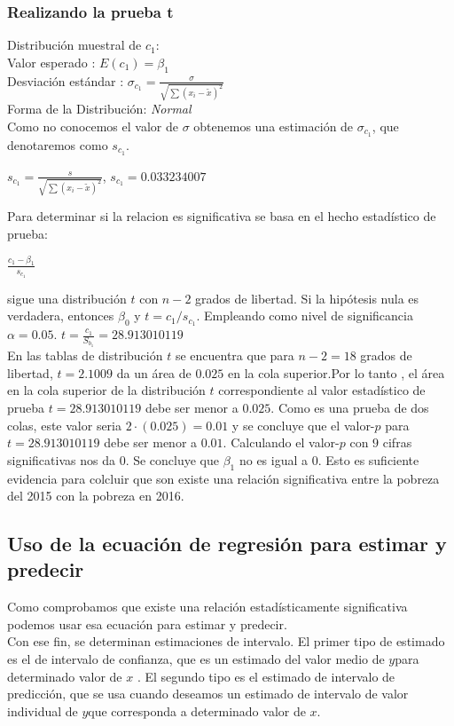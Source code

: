 \documentclass[twocolumn,twoside]{article}
\begin{document}
\subsubsection{Realizando la prueba t}

Distribuci\'on muestral de $c_1$:\\
Valor esperado : $E(c_1)=\beta_1$\\
Desviaci\'on est\'andar : $\sigma_{c_1}=\frac{\sigma}{\sqrt{\sum (x_i-\tilde{x})^2}}$\\
Forma de la Distribuci\'on: \textit{Normal}\\
Como no conocemos el valor de $\sigma$ obtenemos una estimaci\'on de $\sigma_{c_1}$, que denotaremos
como $s_{c_1}$.
\begin{center}
  $s_{c_1}=\frac{s}{\sqrt{\sum (x_i-\tilde{x})^2}}$, $s_{c_1}=0.033234007$
\end{center}

Para determinar si la relacion es significativa se basa en el hecho estad\'istico de prueba:
\begin{center}
  $\frac{c_1-\beta_1}{s_{c_1}}$
\end{center}

sigue una distribuci\'on $t$ con $n-2$ grados de libertad. Si la hip\'otesis nula es verdadera, entonces
$\beta_0$ y $t=c_1/s_{c_1}$. Empleando como nivel de significancia $\alpha=0.05$.
$t=\frac{c_1}{S_{b_1}}=28.913010119$\\
En las tablas de distribuci\'on $t$ se encuentra que para $n-2=18$ grados de libertad, $t=2.1009$
da un \'area de $0.025$ en la cola superior.Por lo tanto , el \'area en la cola superior de la
distribuci\'on $t$ correspondiente al valor estad\'istico de prueba $t=28.913010119$  debe ser menor
a $0.025$. Como es una prueba de dos colas, este valor seria $2\cdot (0.025)=0.01$ y se concluye
que el valor-$p$ para $t= 28.913010119$ debe ser menor a $0.01$. Calculando el valor-$p$ con $9$
cifras significativas nos da $0$. Se concluye que $\beta_1$ no es igual a $0$. Esto es suficiente 
evidencia para colcluir que son existe una relaci\'on significativa entre la pobreza del 2015 con la 
pobreza en 2016.

\subsection{Uso de la ecuaci\'on de regresi\'on para estimar y predecir}

Como comprobamos que existe una relaci\'on estad\'isticamente significativa podemos usar 
esa ecuaci\'on para estimar y predecir.
\\
Con ese fin, se determinan estimaciones de intervalo. El primer tipo de estimado es el de
intervalo de confianza, que es un estimado del valor medio de $y$para determinado valor de $x$ . El segundo
tipo es el estimado de intervalo de predicci\'on, que se usa cuando deseamos un estimado de intervalo de
valor individual de $y $que corresponda a determinado valor de $x$.
\end{document}
